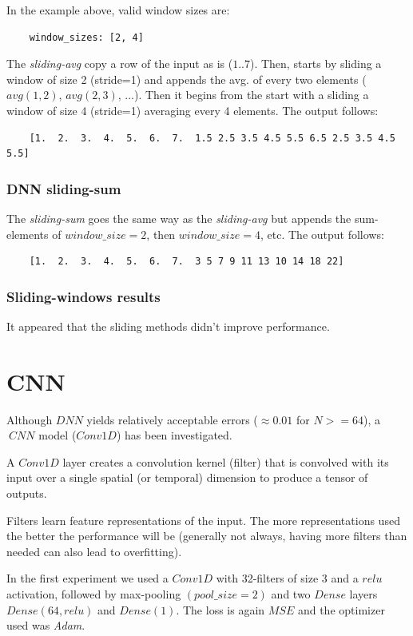 \documentclass[a4paper, 12pt]{report}
\begin{document}
In the example above, valid window sizes are:
\begin{verbatim}
    window_sizes: [2, 4]
\end{verbatim}

The \textit{sliding-avg} copy a row of the input as is ($1..7$). Then, starts by sliding a window of size 2 (stride=1) and appends the avg. of every two elements ($avg(1,2)$, $avg(2,3)$, ...). Then it begins from the start with a sliding a window of size 4 (stride=1) averaging every 4 elements. The output follows:
\begin{verbatim}
    [1.  2.  3.  4.  5.  6.  7.  1.5 2.5 3.5 4.5 5.5 6.5 2.5 3.5 4.5 5.5]
\end{verbatim}

\subsubsection{DNN sliding-sum}
The \textit{sliding-sum} goes the same way as the \textit{sliding-avg} but appends the sum-elements of $window\_size=2$, then $window\_size=4$, etc. The output follows:
\begin{verbatim}
    [1.  2.  3.  4.  5.  6.  7.  3 5 7 9 11 13 10 14 18 22]
\end{verbatim}

\subsubsection{Sliding-windows results}
It appeared that the sliding methods didn't improve performance.

\pagebreak
\section{CNN}
Although $DNN$ yields relatively acceptable errors ($\approx 0.01$ for $N>=64$), a $~CNN$ model ($Conv1D$) has been investigated.

A $Conv1D$ layer creates a convolution kernel (filter) that is convolved with its input over a single spatial (or temporal) dimension to produce a tensor of outputs.

Filters learn feature representations of the input. The more representations used the better the performance will be (generally not always, having more filters than needed can also lead to overfitting).

In the first experiment we used a $Conv1D$ with 32-filters of size 3 and a $relu$ activation, followed by max-pooling $(pool\_size=2)$ and two $Dense$ layers $Dense(64, relu)$ and $Dense(1)$. The loss is again $MSE$ and the optimizer used was \textit{Adam}.
\end{document}
